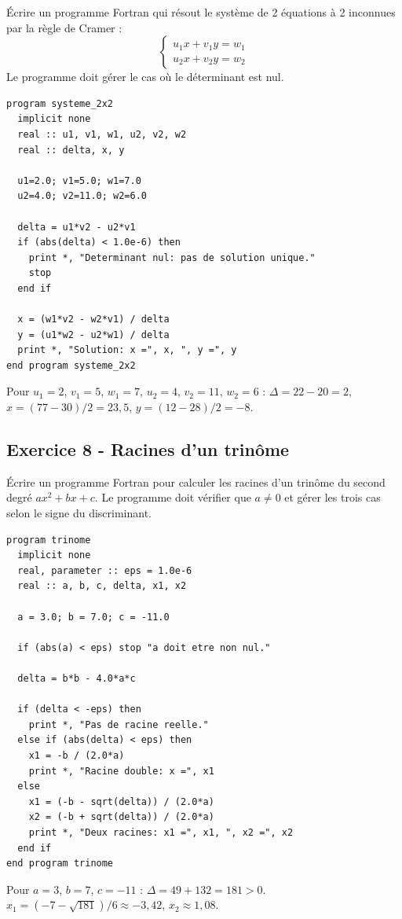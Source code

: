 \documentclass[12pt,a4paper]{article}
\begin{document}
\begin{boiteexercice}
Écrire un programme Fortran qui résout le système de 2 équations à 2 inconnues par la règle de Cramer :
\[
\begin{cases}u_1 x + v_1 y = w_1 \\ u_2 x + v_2 y = w_2\end{cases}
\]
Le programme doit gérer le cas où le déterminant est nul.
\end{boiteexercice}

\begin{boitecorrige}
\begin{lstlisting}
program systeme_2x2
  implicit none
  real :: u1, v1, w1, u2, v2, w2
  real :: delta, x, y

  u1=2.0; v1=5.0; w1=7.0
  u2=4.0; v2=11.0; w2=6.0

  delta = u1*v2 - u2*v1
  if (abs(delta) < 1.0e-6) then
    print *, "Determinant nul: pas de solution unique."
    stop
  end if

  x = (w1*v2 - w2*v1) / delta
  y = (u1*w2 - u2*w1) / delta
  print *, "Solution: x =", x, ", y =", y
end program systeme_2x2
\end{lstlisting}

Pour $u_1=2$, $v_1=5$, $w_1=7$, $u_2=4$, $v_2=11$, $w_2=6$ : $\Delta = 22-20=2$, $x = (77-30)/2 = 23{,}5$, $y = (12-28)/2 = -8$.
\end{boitecorrige}

\subsection*{Exercice 8 - Racines d'un trinôme \niveau{\facile}}

\begin{boiteexercice}
Écrire un programme Fortran pour calculer les racines d'un trinôme du second degré $ax^2 + bx + c$. Le programme doit vérifier que $a \neq 0$ et gérer les trois cas selon le signe du discriminant.
\end{boiteexercice}

\begin{boitecorrige}
\begin{lstlisting}
program trinome
  implicit none
  real, parameter :: eps = 1.0e-6
  real :: a, b, c, delta, x1, x2

  a = 3.0; b = 7.0; c = -11.0

  if (abs(a) < eps) stop "a doit etre non nul."

  delta = b*b - 4.0*a*c

  if (delta < -eps) then
    print *, "Pas de racine reelle."
  else if (abs(delta) < eps) then
    x1 = -b / (2.0*a)
    print *, "Racine double: x =", x1
  else
    x1 = (-b - sqrt(delta)) / (2.0*a)
    x2 = (-b + sqrt(delta)) / (2.0*a)
    print *, "Deux racines: x1 =", x1, ", x2 =", x2
  end if
end program trinome
\end{lstlisting}

Pour $a=3$, $b=7$, $c=-11$ : $\Delta = 49+132 = 181 > 0$. $x_1 = (-7-\sqrt{181})/6 \approx -3{,}42$, $x_2 \approx 1{,}08$.
\end{boitecorrige}
\end{document}
